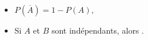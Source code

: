 \begin{fiche}
\begin{prop}
\begin{itemize}
			\item 
				$\displaystyle{P(\overline{A})} = 1 - P(A)$,
			\item Si $A$ et $B$ sont ind\'ependants, alors 
				.
%					

\end{itemize}
\end{prop}
\end{fiche}
